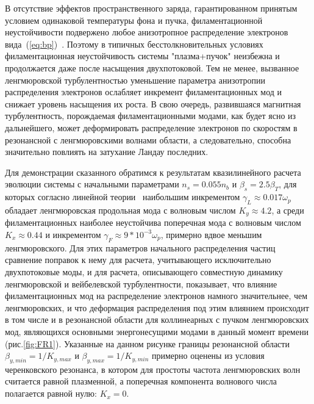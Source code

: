 В отсутствие эффектов пространственного заряда, гарантированном принятым условием одинаковой температуры фона и пучка, филаментационной неустойчивости подвержено любое анизотропное распределение электронов вида~(\ref{eq:bp})~\cite{Tzoufras2006}. Поэтому в типичных бесстолкновительных условиях филаментационная неустойчивость системы "плазма+пучок" неизбежна и продолжается даже после насыщения двухпотоковой. Тем не менее, вызванное ленгмюровской турбулентностью уменьшение параметра анизотропии распределения электронов ослабляет инкремент филаментационных мод и снижает уровень насыщения их роста. В свою очередь, развившаяся магнитная турбулентность, порождаемая филаментационными модами, как будет ясно из дальнейшего, может деформировать распределение электронов по скоростям в резонансной с ленгмюровскими волнами области, а следовательно, способна значительно повлиять на затухание Ландау последних.

Для демонстрации сказанного обратимся к результатам квазилинейного расчета эволюции системы с начальными  параметрами $n_s=0.055n_b$ и $\beta_s=2.5\beta_T$, для которых согласно линейной теории~\cite{Mikhailovsky1971,Davidson1972} наибольшим инкрементом $\gamma_L\approx0.017\omega_p$ обладает ленгмюровская продольная мода с волновым числом $K_y\approx4.2$, а среди филаментационных наиболее неустойчива поперечная мода с волновым числом $K_x\approx0.44$ и инкрементом $\gamma_F\approx9*10^{-3}\omega_p$, примерно вдвое меньшим ленгмюровского. Для этих параметров начального распределения частиц сравнение поправок к нему для расчета, учитывающего исключительно двухпотоковые моды, и для расчета, описывающего совместную динамику ленгмюровской и вейбелевской турбулентности, показывает, что влияние филаментационных мод на распределение электронов намного значительнее, чем ленгмюровских, и что деформация распределения под этим влиянием происходит в том числе и в резонансной области для коллинеарных с пучком ленгмюровских мод, являющихся основными энергонесущими модами в данный момент времени  (рис.\ref{fig:FR1}). Указанные на данном рисунке границы резонансной области $\beta_{y,min}=1/K_{y,max}$ и $\beta_{y,max}=1/K_{y,min}$ примерно оценены из условия черенковского резонанса, в котором для простоты частота ленгмюровских волн считается равной плазменной, а поперечная компонента волнового числа полагается равной нулю: $K_x=0$. 

